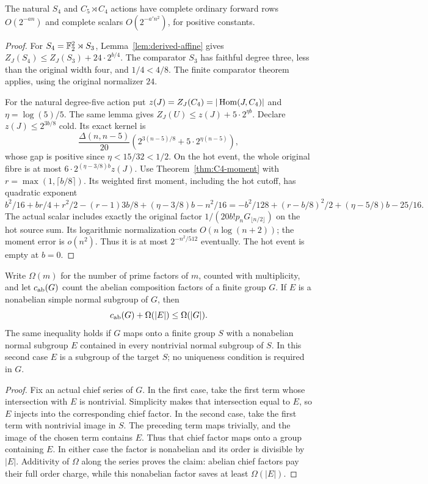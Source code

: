 \begin{proposition}
\label{prop:s4-f20-consumers}
The natural $S_4$ and $C_5\rtimes C_4$ actions have complete
ordinary forward rows $O(2^{-an})$ and complete scalars
$O(2^{-a'n^2})$, for positive constants.
\end{proposition}
\begin{proof}
For $S_4=\mathbb F_2^2\rtimes S_3$,
Lemma~\ref{lem:derived-affine} gives
$Z_J(S_4)\leq Z_J(S_3)+24\cdot2^{b/4}$.
The comparator $S_3$ has faithful degree three, less than
the original width four, and $1/4<4/8$. The finite comparator
theorem applies, using the original normalizer $24$.

For the natural degree-five action put
$z(J)=Z_J(C_4)=|\operatorname{Hom}(J,C_4)|$ and $\eta=\log(5)/5$.
The same lemma gives $Z_J(U)\leq z(J)+5\cdot2^{\eta b}$.
Declare $z(J)\leq2^{3b/8}$ cold. Its exact kernel is
\[
 \frac{\Delta(n,n-5)}{20}
       \left(2^{3(n-5)/8}+5\cdot2^{\eta(n-5)}\right),
\]
whose gap is positive since $\eta<15/32<1/2$.
On the hot event, the whole original fibre is at most
$6\cdot2^{(\eta-3/8)b}z(J)$.
Use Theorem~\ref{thm:C4-moment} with
$r=\max(1,\lceil b/8\rceil)$. Its weighted first moment,
including the hot cutoff, has quadratic exponent
\[
 b^2/16+br/4+r^2/2-(r-1)3b/8+(\eta-3/8)b-n^2/16
 =-b^2/128+(r-b/8)^2/2+(\eta-5/8)b-25/16.
\]
The actual scalar includes exactly the original factor
$1/(20b!p_nG_{\lfloor n/2\rfloor})$ on the hot source sum.
Its logarithmic normalization costs $O(n\log(n+2))$;
the moment error is $o(n^2)$. Thus it is at most
$2^{-n^2/512}$ eventually. The hot event is empty at $b=0$.
\end{proof}

\begin{lemma}
\label{lem:nonabelian-order-saving}
Write $\Omega(m)$ for the number of prime factors of $m$, counted with
multiplicity, and let $c_{\rm ab}(G)$ count the abelian composition factors
of a finite group $G$. If $E$ is a nonabelian simple normal subgroup of
$G$, then
\[
 c_{\rm ab}(G)+\Omega(|E|)\leq\Omega(|G|).
\]
The same inequality holds if $G$ maps onto a finite group $S$ with a
nonabelian normal subgroup $E$ contained in every nontrivial normal
subgroup of $S$. In this second case $E$ is a subgroup of the target $S$;
no uniqueness condition is required in $G$.
\end{lemma}
\begin{proof}
Fix an actual chief series of $G$. In the first case, take the first
term whose intersection with $E$ is nontrivial. Simplicity makes that
intersection equal to $E$, so $E$ injects into the corresponding chief
factor. In the second case, take the first term with nontrivial image
in $S$. The preceding term maps trivially, and the image of the chosen
term contains $E$. Thus that chief factor maps onto a group containing
$E$. In either case the factor is nonabelian and its order is divisible
by $|E|$. Additivity of $\Omega$ along the series proves the claim:
abelian chief factors pay their full order charge, while this nonabelian
factor saves at least $\Omega(|E|)$.
\end{proof}

